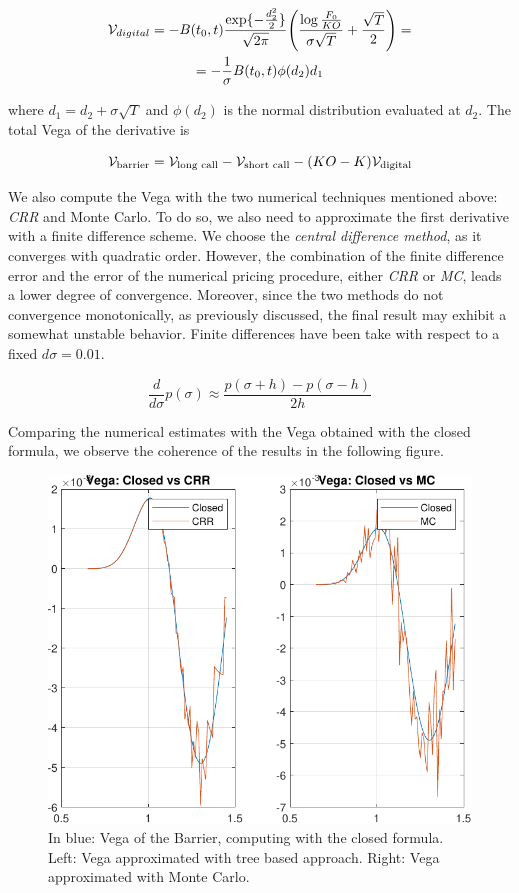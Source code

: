 \begin{gather}
    \mathcal{V}_{digital} = -B(t_0,t)\frac{\exp \{-\frac{d_2^2}{2}\} }{\sqrt{2\pi}}\Bigg(\frac{\log{\frac{F_0}{KO}}}{\sigma \sqrt{T}} + \frac{\sqrt{T}}{2}\Bigg) = \notag \\
    = -\frac{1}{\sigma}B(t_0,t)\phi(d_2) d_1
\end{gather}

where $d_1 = d_2 + \sigma\sqrt{T}$ and $\phi(d_2)$ is the normal distribution evaluated at $d_2$. The total Vega of the derivative is

\begin{equation}
\mathcal{V}_{\text{barrier}} = \mathcal{V}_{\text{long call}} - \mathcal{V}_{\text{short call}} - (KO - K) \mathcal{V}_{\text{digital}}
\end{equation}

We also compute the Vega with the two numerical techniques mentioned above: \textit{CRR} and Monte Carlo. To do so, we also need to approximate the first derivative with a finite difference scheme. We choose the \textit{central difference method}, as it converges with quadratic order. However, the combination of the finite difference error and the error of the numerical pricing procedure, either \textit{CRR} or \textit{MC}, leads a lower degree of convergence. Moreover, since the two methods do not convergence monotonically, as previously discussed, the final result may exhibit a somewhat unstable behavior. Finite differences have been take with respect to a fixed  $d\sigma = 0.01$.

\begin{equation*}
\frac{d}{d\sigma} p(\sigma) \approx \frac{p(\sigma + h) - p(\sigma - h)}{2h}
\end{equation*}

Comparing the numerical estimates with the Vega obtained with the closed formula, we observe the coherence of the results in the following figure.

\begin{figure}[H]
    \centering
    \includegraphics[width=0.7\linewidth]{imgs/vega.pdf}
    \caption{In blue: Vega of the Barrier, computing with the closed formula. Left: Vega approximated with tree based approach. Right: Vega approximated with Monte Carlo.}
    \label{fig:vega}
\end{figure}

